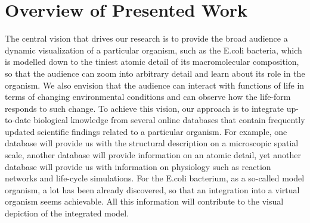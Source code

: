 \section{Overview of Presented Work}

The central vision that drives our research is to provide the broad audience a dynamic visualization of a particular organism, such as the E.coli bacteria, which is modelled down to the tiniest atomic detail of its macromolecular composition, so that the audience can zoom into arbitrary detail and learn about its role in the organism.
We also envision that the audience can interact with functions of life in terms of changing environmental conditions and can observe how the life-form responds to such change. 
To achieve this vision, our approach is to integrate up-to-date biological knowledge from several online databases that contain frequently updated scientific findings related to a particular organism. 
For example, one database will provide us with the structural description on a microscopic spatial scale, another database will provide information on an atomic detail, yet another database will provide us with information on physiology such as reaction networks and life-cycle simulations. 
For the E.coli bacterium, as a so-called model organism, a lot has been already discovered, so that an integration into a virtual organism seems achievable.
All this information will contribute to the visual depiction of the integrated model.

